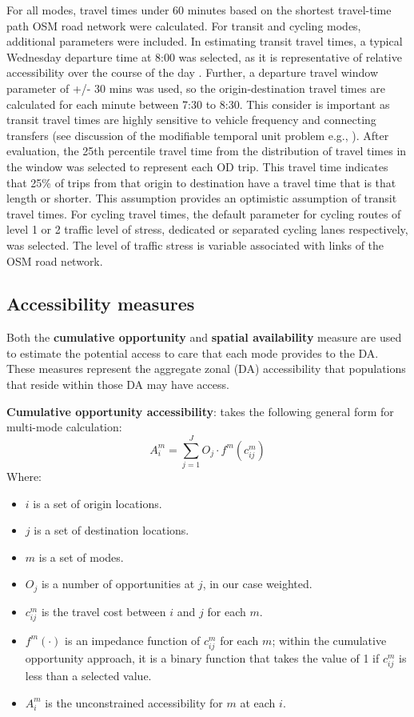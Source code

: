 \documentclass[
  super,
  preprint,
  3p]{elsarticle}
\providecommand{\tightlist}{%
  \setlength{\itemsep}{0pt}\setlength{\parskip}{0pt}}\usepackage{longtable,booktabs,array}
\begin{document}
For all modes, travel times under 60 minutes based on the shortest
travel-time path OSM road network were calculated. For transit and
cycling modes, additional parameters were included. In estimating
transit travel times, a typical Wednesday departure time at 8:00 was
selected, as it is representative of relative accessibility over the
course of the day \citep{boisjolyDailyFluctuationsTransit2016}. Further,
a departure travel window parameter of +/- 30 mins was used, so the
origin-destination travel times are calculated for each minute between
7:30 to 8:30. This consider is important as transit travel times are
highly sensitive to vehicle frequency and connecting transfers (see
discussion of the modifiable temporal unit problem e.g.,
\citep{pereiraFutureAccessibilityImpacts2019}). After evaluation, the
25th percentile travel time from the distribution of travel times in the
window was selected to represent each OD trip. This travel time
indicates that 25\% of trips from that origin to destination have a
travel time that is that length or shorter. This assumption provides an
optimistic assumption of transit travel times. For cycling travel times,
the default parameter for cycling routes of level 1 or 2 traffic level
of stress, dedicated or separated cycling lanes respectively, was
selected. The level of traffic stress is variable associated with links
of the OSM road network.

\hypertarget{accessibility-measures}{%
\subsection{Accessibility measures}\label{accessibility-measures}}

Both the \textbf{cumulative opportunity} and \textbf{spatial
availability} measure are used to estimate the potential access to care
that each mode provides to the DA. These measures represent the
aggregate zonal (DA) accessibility that populations that reside within
those DA may have access.

\textbf{Cumulative opportunity accessibility}: takes the following
general form for multi-mode calculation: \[
A_i^m=\sum_{j=1}^{J}O_j\cdot f^m(c_{ij}^m)
\] \noindent Where:

\begin{itemize}
\tightlist
\item
  \(i\) is a set of origin locations.
\item
  \(j\) is a set of destination locations.
\item
  \(m\) is a set of modes.
\item
  \(O_j\) is a number of opportunities at \(j\), in our case weighted.
\item
  \(c_{ij}^m\) is the travel cost between \(i\) and \(j\) for each
  \(m\).
\item
  \(f^m(\cdot)\) is an impedance function of \(c^m_{ij}\) for each
  \(m\); within the cumulative opportunity approach, it is a binary
  function that takes the value of 1 if \(c^m_{ij}\) is less than a
  selected value.
\item
  \(A^m_{i}\) is the unconstrained accessibility for \(m\) at each
  \(i\).
\end{itemize}
\end{document}
